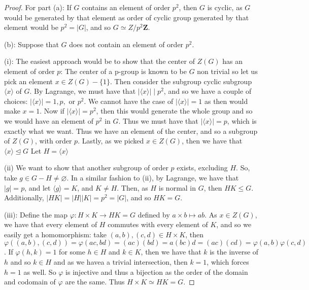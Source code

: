 \documentclass[9pt,reqno]{amsart}
\theoremstyle{definition}
\newcommand{\zz}{\mathbf Z}
\begin{document}
	\begin{proof}
		For part (a): If $G$ contains an element of order $p^2$, then $G$ is cyclic, as $G$ would be generated by that element as order of cyclic group generated by that element would be $p^2 = |G|$, and so $G \simeq Z/p^2 \zz$. 
		
		(b): Suppose that $G$ does not contain an element of order $p^2$. 
		
		(i): The easiest approach would be to show that the center of $Z(G)$ has an element of order $p$: The center of a p-group is known to be $G$ non trivial so let us pick an element $x \in Z(G)- \{1 \}$. Then consider the subgroup cyclic subgroup $\langle x \rangle$ of $G$. By Lagrange, we must have that $|\langle x \rangle | \mid p^2$, and so we have a couple of choices: $|\langle x \rangle| = 1, p,$ or $p^2$. We cannot have the case of $|\langle x \rangle| = 1$ as then would make $x =1$. Now if $| \langle x \rangle| = p^2$, then this would generate the whole group and so we would have an element of $p^2$ in $G$. Thus we must have that $|\langle x \rangle| = p$, which is exactly what we want. Thus we have an element of the center, and so a subgroup of $Z(G)$, with order $p$. Lastly, as we picked $x \in Z(G)$, then we have that $\langle x \rangle \trianglelefteq G$ Let $H = \langle x \rangle$
		
		(ii) We want to show that another subgroup of order $p$ exists, excluding $H$. So, take $g \in G - H \neq \varnothing$. In a similar fashion to (ii), by Lagrange, we have that $|g| = p$, and let $\langle g \rangle = K$, and $K \neq H$.  Then, as $H$ is normal in $G$, then $HK \leq G$. Additionally, $|HK| = |H| |K| = p^2 = |G|$, and so  $HK = G$. 
		
		(iii): Define the map $\varphi \colon H \times K \to HK =G$ defined by $a\times b \mapsto ab$. As $x \in Z(G)$, we have that every element of $H$ commutes with every element of $K$, and so we easily get a homomorphism: take $(a,b), (c,d) \in H \times K$, then $\varphi((a,b), (c,d)) = \varphi (ac, bd) = (ac)(bd) = a(bc)d = (ac) (cd) = \varphi(a, b) \varphi(c, d)$. If $\varphi (h, k) = 1$ for some $h \in H$ and $k \in K$, then we have that $k$ is the inverse of $h$ and so $k \in H$ and as we havea a trivial intersection, then $k =1$, which forces $h= 1$ as well. So $\varphi$ is injective and thus a bijection as the order of the domain and codomain of $\varphi$ are the same. Thus $H \times K \simeq HK = G$. 
	\end{proof}
		
\end{document}
